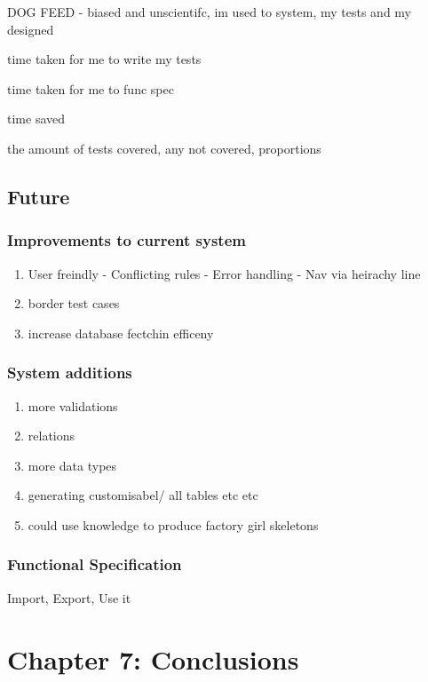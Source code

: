 \documentclass[a4paper,12pt]{article}
\begin{document}
\par DOG FEED - biased and unscientifc, im used to system, my tests and my designed
\par time taken for me to write my tests
\par time taken for me to func spec
\par time saved
\par the amount of tests covered, any not covered, proportions

\subsection{Future}

\subsubsection{Improvements to current system}

\begin{enumerate}
\item User freindly - Conflicting rules - Error handling - Nav via heirachy line
\item border test cases
\item increase database fectchin efficeny
\end{enumerate}

\subsubsection{System additions}

\begin{enumerate}
\item more validations
\item relations
\item more data types
\item generating customisabel/ all tables etc etc
\item could use knowledge to produce factory girl skeletons
\end{enumerate}

\subsubsection{Functional Specification}
\par Import, Export, Use it

\section{Chapter 7: Conclusions}
\end{document}
